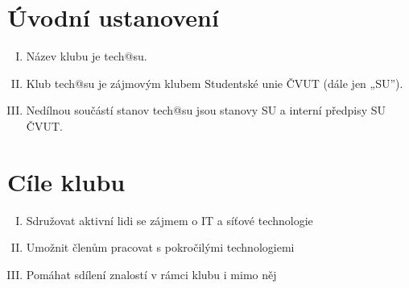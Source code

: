 \documentclass[10pt]{article}
\begin{document}
\section{Úvodní ustanovení} %
	\begin{enumerate}[I.]
	\item Název klubu je tech@su.
	\item Klub tech@su je zájmovým klubem Studentské unie ČVUT (dále jen „SU”).  
	\item Nedílnou součástí stanov tech@su jsou stanovy SU a interní předpisy SU ČVUT.
	\end{enumerate}

\section{Cíle klubu}
	\begin{enumerate}[I.]
		\item Sdružovat aktivní lidi se zájmem o IT a síťové technologie
		\item Umožnit členům pracovat s pokročilými technologiemi
		\item Pomáhat sdílení znalostí v rámci klubu i mimo něj
	\end{enumerate}
\end{document}

